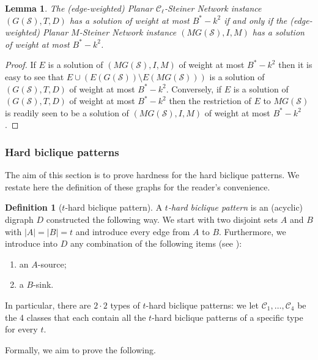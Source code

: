 \documentclass[a4paper,11pt]{article}
\theoremstyle{plain}
\newtheorem{lemma}[theorem]{Lemma}
\newtheorem{identification rule}{Identification Rule}
\theoremstyle{definition}
\newtheorem{definition}[theorem]{Definition}
\theoremstyle{remark}
\begin{document}
\begin{lemma}
The (edge-weighted) {\sc Planar $\mathcal{C}_\ell$-Steiner Network} instance $(G(\mathcal{S}),T,D)$ has a solution of weight at most $B^*-k^2$ if and only if the (edge-weighted) {\sc Planar $M$-Steiner Network} instance $(MG(\mathcal{S}),I,M)$ has a solution of weight at most $B^*-k^2$.
\end{lemma}

\begin{proof}
If $E$ is a solution of $(MG(\mathcal{S}),I,M)$ of weight at most $B^*-k^2$ then it is easy to see that $E \cup (E(G(\mathcal{S})) \setminus E(MG(\mathcal{S})))$ is a solution of $(G(\mathcal{S}),T,D)$ of weight at most $B^*-k^2$.
Conversely, if $E$ is a solution of $(G(\mathcal{S}),T,D)$ of weight at most $B^*-k^2$ then the restriction of $E$ to $MG(\mathcal{S})$ is readily seen to be a solution of $(MG(\mathcal{S}),I,M)$ of weight at most $B^*-k^2$.
\end{proof}

\subsubsection{Hard biclique patterns}
\label{sec:biclique}

The aim of this section is to prove hardness for the hard biclique patterns. We restate here the definition of these graphs for the reader's convenience.

\begingroup
\def\thetheorem{\ref{def:cleanedbiclique}}
\begin{definition}[$t$-hard biclique pattern]
A \emph{$t$-hard biclique pattern} is an (acyclic) digraph $D$ constructed the following way. We start with two disjoint sets $A$ and $B$ with  $|A| = |B| = t$ and introduce every edge from $A$ to $B$. Furthermore, we introduce into $D$ any combination of the following items (see ):
\begin{enumerate}
\item an $A$-source;
\item a $B$-sink.
\end{enumerate}
In particular, there are $2 \cdot 2$ types of $t$-hard biclique patterns: we let $\mathcal{C}_1,\ldots,\mathcal{C}_4$ be the 4 classes that each contain all the $t$-hard biclique patterns of a specific type for every $t$.
\end{definition}
\addtocounter{theorem}{-1}
\endgroup

Formally, we aim to prove the following.
\end{document}
